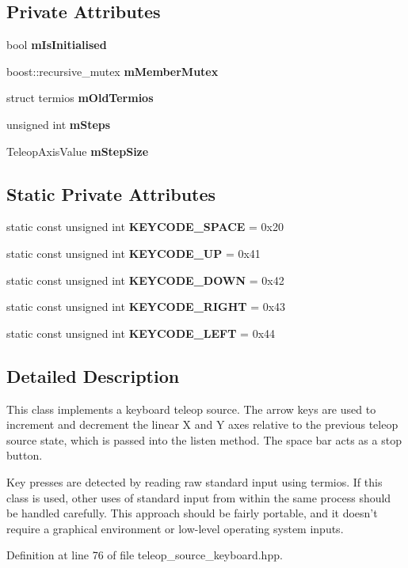 \subsection*{Private Attributes}
\begin{DoxyCompactItemize}
\item 
bool {\bf mIsInitialised}
\item 
boost::recursive\_\-mutex {\bf mMemberMutex}
\item 
struct termios {\bf mOldTermios}
\item 
unsigned int {\bf mSteps}
\item 
TeleopAxisValue {\bf mStepSize}
\end{DoxyCompactItemize}
\subsection*{Static Private Attributes}
{\bf }\par
\begin{DoxyCompactItemize}
\item 
static const unsigned int {\bf KEYCODE\_\-SPACE} = 0x20
\item 
static const unsigned int {\bf KEYCODE\_\-UP} = 0x41
\item 
static const unsigned int {\bf KEYCODE\_\-DOWN} = 0x42
\item 
static const unsigned int {\bf KEYCODE\_\-RIGHT} = 0x43
\item 
static const unsigned int {\bf KEYCODE\_\-LEFT} = 0x44
\end{DoxyCompactItemize}



\subsection{Detailed Description}
This class implements a keyboard teleop source. The arrow keys are used to increment and decrement the linear X and Y axes relative to the previous teleop source state, which is passed into the listen method. The space bar acts as a stop button.

Key presses are detected by reading raw standard input using termios. If this class is used, other uses of standard input from within the same process should be handled carefully. This approach should be fairly portable, and it doesn't require a graphical environment or low-\/level operating system inputs. 

Definition at line 76 of file teleop\_\-source\_\-keyboard.hpp.



